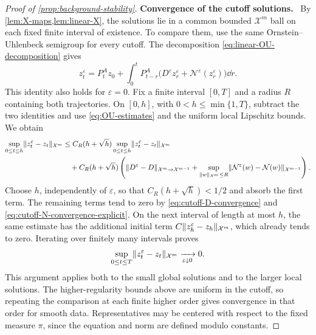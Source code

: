 \documentclass[11pt,reqno]{amsart}
\numberwithin{equation}{section}
\theoremstyle{plain}
\theoremstyle{remark}
\DeclarePairedDelimiter{\norm}{\lVert}{\rVert}
\newcommand{\parheading}[1]{\par\medskip\noindent\textbf{#1}\ }
\newcommand{\Xspace}{\mathcal X}
\begin{document}
\begin{proof}[Proof of \cref{prop:background-stability}]
\parheading{Convergence of the cutoff solutions.}
By \cref{lem:X-maps,lem:linear-X}, the solutions lie in a common bounded $\Xspace^m$ ball on each fixed finite interval of existence. To compare them, use the same Ornstein--Uhlenbeck semigroup for every cutoff. The decomposition \eqref{eq:linear-OU-decomposition} gives
\begin{equation}\label{eq:nonlinear-common-OU}
 z_t^\varepsilon=P_t^Az_0+
 \int_0^tP_{t-r}^A\bigl(D^\varepsilon z_r^\varepsilon+
                    \mathcal N^\varepsilon(z_r^\varepsilon)\bigr)\dd r.
\end{equation}
This identity also holds for $\varepsilon=0$. Fix a finite interval $[0,T]$ and a radius $R$ containing both trajectories. On $[0,h]$, with $0<h\le\min\{1,T\}$, subtract the two identities and use \eqref{eq:OU-estimates} and the uniform local Lipschitz bounds. We obtain
\begin{align}
 \sup_{0\le t\le h}\norm{z_t^\varepsilon-z_t}_{\Xspace^m}
 &\le C_R(h+\sqrt h)
       \sup_{0\le t\le h}\norm{z_t^\varepsilon-z_t}_{\Xspace^m}\notag\\
 &\quad+C_R(h+\sqrt h)\left(
       \norm{D^\varepsilon-D}_{\Xspace^m\to\Xspace^{m-1}}
       +\sup_{\norm w_{\Xspace^m}\le R}
        \norm{\mathcal N^\varepsilon(w)-\mathcal N(w)}_{\Xspace^{m-1}}
                       \right).
 \label{eq:nonlinear-cutoff-comparison}
\end{align}
Choose $h$, independently of $\varepsilon$, so that $C_R(h+\sqrt h)<1/2$ and absorb the first term. The remaining terms tend to zero by \eqref{eq:cutoff-D-convergence} and \eqref{eq:cutoff-N-convergence-explicit}. On the next interval of length at most $h$, the same estimate has the additional initial term $C\norm{z_h^\varepsilon-z_h}_{\Xspace^m}$, which already tends to zero. Iterating over finitely many intervals proves
\begin{equation}\label{eq:logarithmic-cutoff-convergence}
 \sup_{0\le t\le T}\norm{z_t^\varepsilon-z_t}_{\Xspace^m}\xrightarrow[\varepsilon\downarrow0]{}0.
\end{equation}
This argument applies both to the small global solutions and to the larger local solutions. The higher-regularity bounds above are uniform in the cutoff, so repeating the comparison at each finite higher order gives convergence in that order for smooth data. Representatives may be centered with respect to the fixed measure $\pi$, since the equation and norm are defined modulo constants.


\end{proof}
\end{document}

